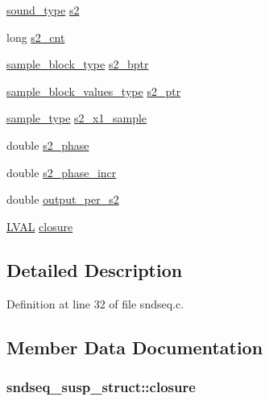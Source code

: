 \begin{DoxyCompactItemize}
\hyperlink{sound_8h_a792cec4ed9d6d636d342d9365ba265ea}{sound\+\_\+type} \hyperlink{structsndseq__susp__struct_a75a750d3f6e731bebc9e217455961460}{s2}
\item 
long \hyperlink{structsndseq__susp__struct_abc4f99cbcc64b590073662e5be968288}{s2\+\_\+cnt}
\item 
\hyperlink{sound_8h_a6becaef7eb98c0e45b13f72dadf07b23}{sample\+\_\+block\+\_\+type} \hyperlink{structsndseq__susp__struct_a3759a96ce36fdee293c2bc6be1a801a5}{s2\+\_\+bptr}
\item 
\hyperlink{sound_8h_a83d17f7b465d1591f27cd28fc5eb8a03}{sample\+\_\+block\+\_\+values\+\_\+type} \hyperlink{structsndseq__susp__struct_a89610d179e4eb86db8cbe65068412ec9}{s2\+\_\+ptr}
\item 
\hyperlink{sound_8h_a3a9d1d4a1c153390d2401a6e9f71b32c}{sample\+\_\+type} \hyperlink{structsndseq__susp__struct_a0144b74e520a337f8225b38b06e19c3f}{s2\+\_\+x1\+\_\+sample}
\item 
double \hyperlink{structsndseq__susp__struct_af81c0a094b63d2cc078bb819f5417ea5}{s2\+\_\+phase}
\item 
double \hyperlink{structsndseq__susp__struct_a049976a5eca9c1199900485f96b8da2a}{s2\+\_\+phase\+\_\+incr}
\item 
double \hyperlink{structsndseq__susp__struct_a8a95c278797322cb12beb29433187a61}{output\+\_\+per\+\_\+s2}
\item 
\hyperlink{xldmem_8h_a9a9ec6a5fbca2b40ed8d19faa799be8c}{L\+V\+AL} \hyperlink{structsndseq__susp__struct_a26f0502792041d79ded4c51991d1237e}{closure}
\end{DoxyCompactItemize}


\subsection{Detailed Description}


Definition at line 32 of file sndseq.\+c.



\subsection{Member Data Documentation}
\subsubsection[{\texorpdfstring{closure}{closure}}]{ sndseq\+\_\+susp\+\_\+struct\+::closure}\hypertarget{structsndseq__susp__struct_a26f0502792041d79ded4c51991d1237e}{}\label{structsndseq__susp__struct_a26f0502792041d79ded4c51991d1237e}


